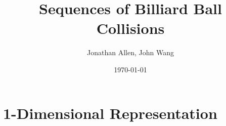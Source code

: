 \documentclass[12pt]{amsart}   %
\begin{document}
\graphicspath{ {figures/} }

\title[Billiards]{Sequences of Billiard Ball Collisions}

\author{Jonathan Allen, John Wang}
\date{\today}

\maketitle


% 

% 

% 

\section{1-Dimensional Representation}


% 

\begin{appendix}
\end{appendix}
\end{document}
